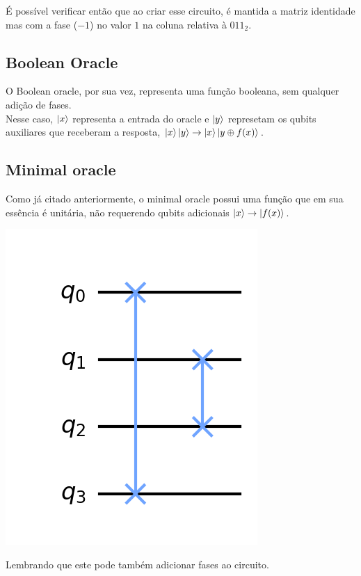 \documentclass{article}
\begin{document}
É possível verificar então que ao criar esse circuito, é mantida a matriz identidade mas com a fase ($-1$) no valor $1$ na coluna relativa à $011_{2}$. 


\subsection{Boolean Oracle}

O Boolean oracle, por sua vez, representa uma função booleana, sem qualquer adição de fases.\\
Nesse caso, $\mathinner{|{x}\rangle}$ representa a entrada do oracle e $\mathinner{|{y}\rangle}$ represetam os qubits auxiliares que receberam a resposta, $\mathinner{|{x}\rangle}\mathinner{|{y}\rangle} \to \mathinner{|{x}\rangle}\mathinner{|{y \oplus f(x)}\rangle}$.

\subsection{Minimal oracle}

Como já citado anteriormente, o minimal oracle possui uma função que em sua essência é unitária, não requerendo qubits adicionais $\mathinner{|{x}\rangle} \to \mathinner{|{f(x)}\rangle}$.

\begin{center}
	\includegraphics[scale=0.3]{minimal-oracle.png}
	\label{fig:minimal-oracle}
\end{center}

Lembrando que este pode também adicionar fases ao circuito.
\end{document}

